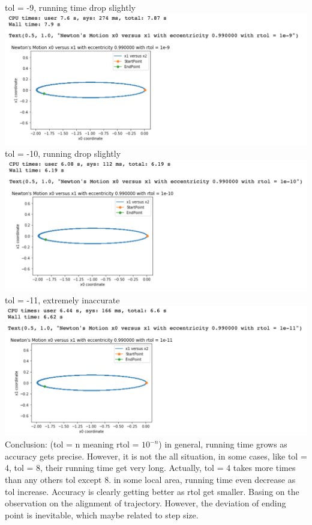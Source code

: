 \documentclass[11pt]{article}
\begin{document}
tol = -9, running time drop slightly\\
\includegraphics[scale = 0.8]{9.png}\newpage
tol = -10, running drop slightly\\
\includegraphics[scale = 0.8]{10.png}
tol = -11, extremely inaccurate\\
\includegraphics[scale = 0.8]{11.png}\\
Conclusion: (tol = n meaning rtol = $10^{-n}$) in general, running time grows as accuracy gets precise. However, it is not the all situation, in some cases, like tol = 4, tol = 8, their running time get very long. Actually, tol = 4 takes more times than any others tol except 8. in some local area, running time even decrease as tol increase.
	Accuracy is clearly getting better as rtol get smaller. Basing on the observation on the alignment of trajectory. However, the deviation of ending point is inevitable, which maybe related to step size.
\end{document}
